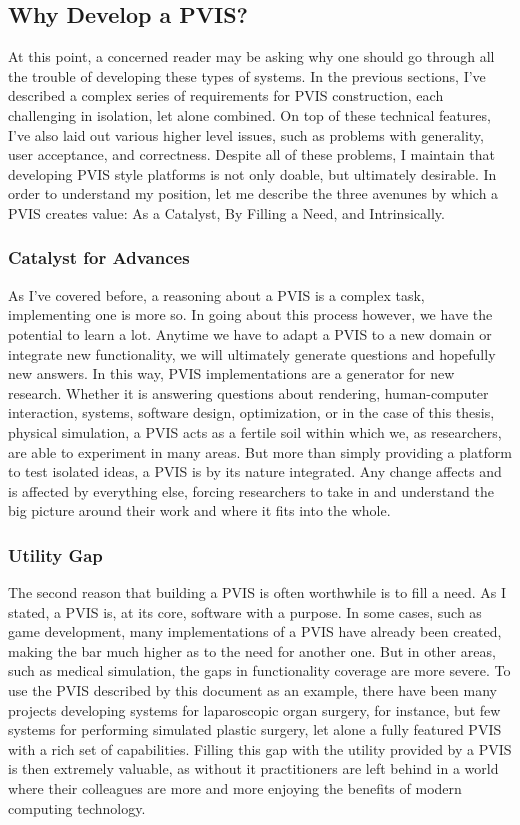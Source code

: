 \documentclass[12pt,oneside,letterpaper]{memoir}
\begin{document}
 
\subsection{Why Develop a PVIS?}

At this point, a concerned reader may be asking why one should go
through all the trouble of developing these types of systems. In the
previous sections, I've described a complex series of requirements for
PVIS construction, each challenging in isolation, let alone
combined. On top of these technical features, I've also laid out
various higher level issues, such as problems with generality, user
acceptance, and correctness. Despite all of these problems, I maintain
that developing PVIS style platforms is not only doable, but
ultimately desirable. In order to understand my position, let me
describe the three avenunes by which a PVIS creates value:
As a Catalyst, By Filling a Need, and Intrinsically.  

\subsubsection{Catalyst for Advances}

As I've covered before, a reasoning about a PVIS is a complex task,
implementing one is more so. In going about this process however, we
have the potential to learn a lot. Anytime we have to adapt a PVIS to
a new domain or integrate new functionality, we will ultimately
generate questions and hopefully new answers. In this way, PVIS
implementations are a generator for new research. Whether it is
answering questions about rendering, human-computer interaction,
systems, software design, optimization, or in the case of this thesis,
physical simulation, a PVIS acts as a fertile soil within which we, as
researchers, are able to experiment in many areas. But more than
simply providing a platform to test isolated ideas, a PVIS is by its
nature integrated. Any change affects and is affected by everything
else, forcing researchers to take in and understand the big picture
around their work and where it fits into the whole.

\subsubsection{Utility Gap}

The second reason that building a PVIS is often worthwhile is to fill
a need. As I stated, a PVIS is, at its core, software with a
purpose. In some cases, such as game development, many implementations
of a PVIS have already been created, making the bar much higher as to
the need for another one. But in other areas, such as medical
simulation, the gaps in functionality coverage are more severe. To use
the PVIS described by this document as an example, there have been
many projects developing systems for laparoscopic organ surgery, for
instance, but few systems for performing simulated plastic surgery,
let alone a fully featured PVIS with a rich set of
capabilities. Filling this gap with the utility provided by a PVIS is
then extremely valuable, as without it practitioners are left behind in
a world where their colleagues are more and more enjoying the benefits
of modern computing technology.
\end{document}
